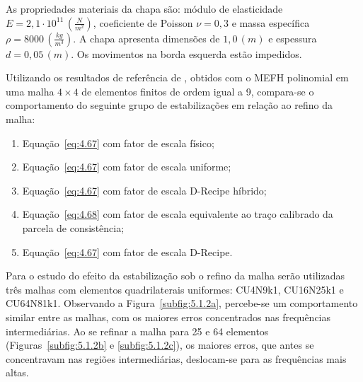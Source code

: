 \indent As propriedades materiais da chapa são: módulo de elasticidade $E = 2,1 \cdot 10^{11} \, \left(\frac{N}{m^2}\right)$, coeficiente de Poisson $\nu = 0,3$ e massa específica $\rho = 8000 \, \left(\frac{kg}{m^3}\right)$. A chapa apresenta dimensões de $1,0\,(m)$ e espessura $d = 0,05\,(m)$. Os movimentos na borda esquerda estão impedidos.

\indent Utilizando os resultados de referência de \citet{torii2012analise}, obtidos com o MEFH polinomial em uma malha $4\times4$ de elementos finitos de ordem igual a 9, compara-se o comportamento do seguinte grupo de estabilizações em relação ao refino da malha:
\begin{enumerate}
    \item Equação~\ref{eq:4.67} com fator de escala físico;
    \item Equação~\ref{eq:4.67} com fator de escala uniforme;
    \item Equação~\ref{eq:4.67} com fator de escala D-Recipe híbrido;
    \item Equação~\ref{eq:4.68} com fator de escala equivalente ao traço calibrado da parcela de consistência;
    \item Equação~\ref{eq:4.67} com fator de escala D-Recipe.
\end{enumerate}

\indent Para o estudo do efeito da estabilização sob o refino da malha serão utilizadas três malhas com elementos quadrilaterais uniformes: CU4N9k1, CU16N25k1 e CU64N81k1. Observando a Figura~\ref{subfig:5.1.2a}, percebe-se um comportamento similar entre as malhas, com os maiores erros concentrados nas frequências intermediárias. Ao se refinar a malha para 25 e 64 elementos (Figuras~\ref{subfig:5.1.2b} e \ref{subfig:5.1.2c}), os maiores erros, que antes se concentravam nas regiões intermediárias, deslocam-se para as frequências mais altas.

